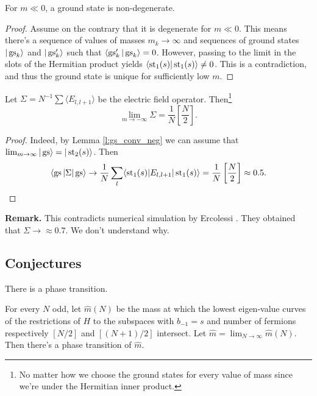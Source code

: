 \begin{proposition}\label{p:low_mass_nondeg}
For $m \ll 0$, a ground state is non-degenerate.
\end{proposition}
\begin{proof}
Assume on the contrary that it is degenerate for $m \ll 0$. This means there's a sequence of values of masses $m_k \rightarrow \infty$ and sequences of ground states $|\operatorname{gs}_k\rangle$ and $|\operatorname{gs}^\prime_k\rangle$ such that $\langle\operatorname{gs}_k^\prime|\operatorname{gs}_k\rangle = 0$. However, passing to the limit in the slots of the Hermitian product yields $\langle \operatorname{st}_1(s) | \operatorname{st}_1(s) \rangle \neq 0$. This is a contradiction, and thus the ground state is unique for sufficiently low $m$.
\end{proof}

\begin{proposition}
Let $\Sigma = N^{-1}\sum \langle E_{l,l+1} \rangle$ be the electric field operator. Then\footnote{No matter how we choose the ground states for every value of mass since we're under the Hermitian inner product.} 
\[
\lim_{m \rightarrow -\infty} \Sigma = \frac{1}{N}\left[\frac{N}{2}\right].
\]
\end{proposition}
\begin{proof}
Indeed, by Lemma \ref{l:gs_conv_neg} we can assume that $\lim_{m \rightarrow \infty} |\operatorname{gs}\rangle = |\operatorname{st}_2(s)\rangle$. Then 
\[
\langle \operatorname{gs} |\Sigma | \operatorname{gs} \rangle \rightarrow \frac{1}{N}\sum_l\langle \operatorname{st}_1(s) | E_{l,l+1}|\operatorname{st}_1(s)\rangle = \frac{1}{N}\left[\frac{N}{2}\right] \approx 0.5.\qedhere
\]
\end{proof}
\noindent \textbf{Remark.} This contradicts numerical simulation by Ercolessi \cite{ercolessi}. They obtained that $\Sigma \rightarrow \approx 0.7$. We don't understand why.

\subsection{Conjectures}

\begin{conj}
There is a phase transition.
\end{conj}

\begin{conj}
For every $N$ odd, let $\hat{m}(N)$ be the mass at which the lowest eigen-value curves of the restrictions of $H$ to the subspaces with $b_{-1} = s$ and number of fermions respectively $[N/2]$ and $[(N+1)/2]$ intersect. Let $\hat{m} = \lim_{N \rightarrow \infty} \hat{m}(N)$. Then there's a phase transition of $\hat{m}$.
\end{conj}

